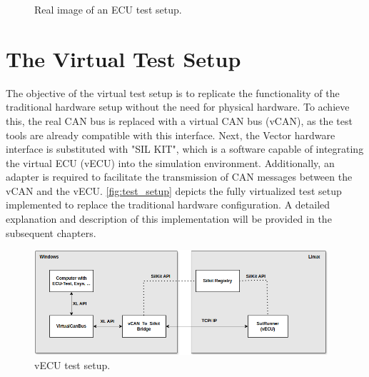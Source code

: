 \begin{figure}[htpb]
  \centering
  \caption{Real image of an ECU test setup.} 
  \label{fig:Real_hardware}
\end{figure}





\section{The Virtual Test Setup}
The objective of the virtual test setup is to replicate the functionality of the traditional hardware setup without the need for physical hardware. To achieve this, the real CAN bus is replaced with a virtual CAN bus (vCAN), as the test tools are already compatible with this interface. Next, the Vector hardware interface is substituted with "SIL KIT", which is a software capable of integrating the virtual ECU (vECU) into the simulation environment. Additionally, an adapter is required to facilitate the transmission of CAN messages between the vCAN and the vECU. \autoref{fig:test_setup} depicts the fully virtualized test setup implemented to replace the traditional hardware configuration. A detailed explanation and description of this implementation will be provided in the subsequent chapters.


\begin{figure}[htpb]
  \centering
  \includegraphics[width=0.97\textwidth]{figures/test_setup2.PNG}
  \caption{vECU test setup.} \label{fig:test_setup}
\end{figure}


